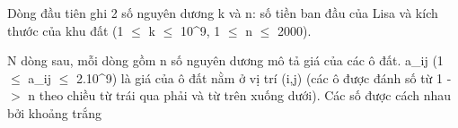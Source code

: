 Dòng đầu tiên ghi 2 số nguyên dương k và n: số tiền ban đầu của Lisa và kích thước của khu đất (1  $\le$  k  $\le$  10^9, 1  $\le$  n  $\le$  2000).  

   N dòng sau, mỗi dòng gồm n số nguyên dương mô tả giá của các ô đất. a\_ij (1  $\le$  a­\_ij  $\le$  2.10^9) là giá của ô đất nằm ở vị trí (i,j) (các ô được đánh số từ 1 -$>$ n theo chiều từ trái qua phải và từ trên xuống dưới). Các số được cách nhau bởi khoảng trắng